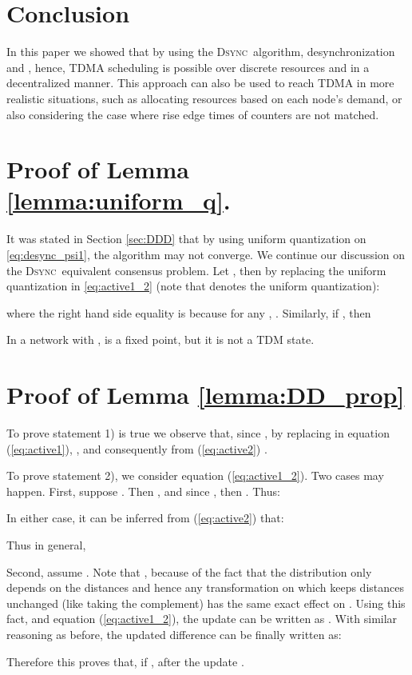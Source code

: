 \documentclass[conference]{IEEEtran}
\newcommand{\DDD}{\textsc{Dsync~}}
\theoremstyle{definition}
\theoremstyle{definition}
\begin{document}
\section{Conclusion}\label{sec:conclusion}
In this paper we showed that by using the \DDD algorithm, desynchronization and , hence, TDMA scheduling is possible over discrete resources and in a decentralized manner. This approach can also be used to reach TDMA in more realistic situations, such as allocating resources based on each node's demand, or also considering the case where rise edge times of counters are not matched.
\appendices
\section{Proof of Lemma \ref{lemma:uniform_q}.}\label{App:uniform}
It was stated in Section \ref{sec:DDD} that by using uniform quantization on \eqref{eq:desync_psi1}, the algorithm may not converge. We continue our discussion on the \DDD equivalent consensus problem. Let , then by replacing the uniform quantization in \eqref{eq:active1_2} (note that  denotes the uniform quantization):
 
where the right hand side equality is because for any , . Similarly, if , then 

In a network with ,  is a fixed point, but it is not a TDM state.
\section{Proof of Lemma \ref{lemma:DD_prop}}\label{app_1}
To prove statement 1) is true we observe that, since , by replacing  in equation (\ref{eq:active1}), , and consequently from (\ref{eq:active2}) . 

To prove statement 2), we consider equation (\ref{eq:active1_2}). Two cases may happen. First, suppose . Then 
,
and since , then . Thus:

In either case, it can be inferred from (\ref{eq:active2}) that:

Thus in general, 

Second, assume . 
Note that , because of the fact that the distribution only depends on the distances and hence any transformation on  which keeps distances unchanged (like taking the complement) has the same exact effect on . Using this fact, and equation (\ref{eq:active1_2}), the update can be written as 
.
With similar reasoning as before, the updated difference can be finally written as:

Therefore this proves that, if , after the update .
\end{document}
